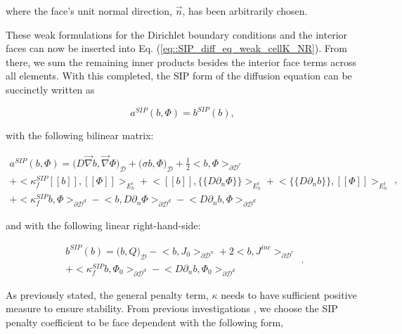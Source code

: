\noindent where the face's unit normal direction, $\vec{n}$, has been arbitrarily chosen.

These weak formulations for the Dirichlet boundary conditions and the interior faces can now be inserted into Eq. (\ref{eq::SIP_diff_eq_weak_cellK_NR}). From there, we sum the remaining inner products besides the interior face terms across all elements. With this completed, the SIP form of the diffusion equation can be succinctly written as

\begin{equation}
a^{SIP}( b, \Phi) = b^{SIP}(b),
\label{eq::SIP_weak_form}
\end{equation}

\noindent with the following bilinear matrix:

\begin{equation}
\label{eq::SIP_bilinear_form}
\begin{aligned}
a^{SIP}( b, \Phi)  = \Big(  D \vec{\nabla}  b , \vec{\nabla} \Phi  \Big)_{\mathcal{D}} + \Big(  \sigma   b ,  \Phi  \Big)_{\mathcal{D}}  +  \frac{1}{2} \Big<    b , \Phi \Big>_{\partial \mathcal{D}^r}   \\
+  \Big< \kappa_f^{SIP} [\![   b ]\!] , [\![  \Phi ]\!]\Big>_{E_h^i} + \Big<  [\![   b ]\!] , \{\!\{  D \partial_n \Phi \}\!\}\Big>_{E_h^i}  + \Big< \{\!\{  D \partial_n  b \}\!\} , [\![ \Phi ]\!]\Big>_{E_h^i} \\
+ \Big< \kappa_f^{SIP}   b ,   \Phi \Big>_{\partial \mathcal{D}^d} - \Big<   b  ,  D \partial_n \Phi \Big>_{\partial \mathcal{D}^d} - \Big<   D 				\partial_n  b , \Phi \Big>_{\partial \mathcal{D}^d}  
\end{aligned} ,
\end{equation}

\noindent and with the following linear right-hand-side:

\begin{equation}
\label{eq::SIP_linear_form}
\begin{aligned}
b^{SIP} (b) = \Big(  b, Q  \Big)_{\mathcal{D}}  - \Big<   b, J_{0}  \Big>_{\partial \mathcal{D}^n} +  2 \Big<  b, J^{inc}  \Big>_{\partial \mathcal{D}^r} \\ + \Big< \kappa_f^{SIP}  b, \Phi_0  \Big>_{\partial \mathcal{D}^d} - \Big<    D \partial_n b ,\Phi_0 \Big>_{\partial \mathcal{D}^d} 
\end{aligned} .
\end{equation}

\noindent As previously stated, the general penalty term, $\kappa$ needs to have sufficient positive measure to ensure stability. From previous investigations \cite{ref::DSA_wang_ragusa,wang2009adaptive,turcksin2014discontinuous}, we choose the SIP penalty coefficient to be face dependent with the following form,

